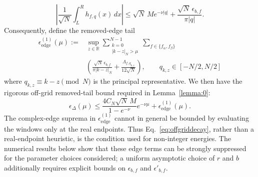 \documentclass[aps,floatfix,10pt,amssymb,amsfont,amsmath,superscriptaddress,float,nofootinbib,longbibliography,nobalancelastpage,twocolumn]{revtex4-2}
\begin{document}
\begin{equation}
    \left|\frac{1}{\sqrt N}\int_L^R h_{f,q}(x)\,dx\right|
    \leq \sqrt N\,M e^{-\nu|q|}
    +\frac{\sqrt N\,\epsilon_{b,f}}{\pi|q|}.
\end{equation}
Consequently, define the removed-edge tail
\begin{equation}
\begin{split}
    \epsilon_{\mathrm{edge}}^{(1)}(\mu):={}&
    \sup_{z\in\mathbb R}
    \sum_{\substack{k=0\\|k-z|_N>\mu}}^{N-1}
    \sum_{f\in\{f_{\alpha},f_{\beta}\}}\\[-0.2em]
    &\left(\frac{\sqrt N\,\epsilon_{b,f}}{\pi|k-z|_N}
    +\frac{\Lambda_{f,q_{k,z}}}{12\sqrt N}\right),
    \qquad q_{k,z}\in[-N/2,N/2]
\end{split}
\end{equation}
where $q_{k,z}\equiv k-z\pmod N$ is the principal representative.
We then have the rigorous off-grid removed-tail bound required in
Lemma~\ref{lemma:0}:
\begin{equation}
    \epsilon_{\Delta}(\mu)\leq
    \frac{4C_N\sqrt N\,M}{1-e^{-\nu}}e^{-\nu\mu}
    +\epsilon_{\mathrm{edge}}^{(1)}(\mu).
    \label{eq:offgriddecay}
\end{equation}
The complex-edge suprema in $\epsilon_{\mathrm{edge}}^{(1)}$ cannot in
general be bounded by evaluating the windows only at the real endpoints.
Thus Eq.~\eqref{eq:offgriddecay}, rather than a real-endpoint heuristic, is
the condition used for non-integer energies. The numerical results below
show that these edge terms can be strongly suppressed for the parameter
choices considered; a uniform asymptotic choice of $r$ and $b$ additionally
requires explicit bounds on $\epsilon_{b,f}$ and $\epsilon'_{b,f}$.
\end{document}
